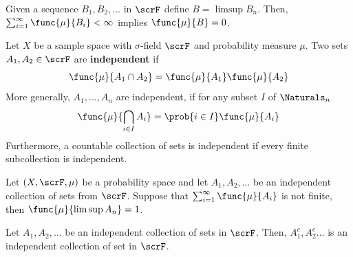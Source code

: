 \begin{theorem}
    Given a sequence \(B_1, B_2,\dots\) in \(\scrF\) define \(B = \limsup B_n\). Then, \(\sum_{i= 1}^{\infty} \func{\mu}{B_i} < \infty\) implies \(\func{\mu}{B} = 0\).
\end{theorem}

\begin{definition}
    Let \(X\) be a sample space with \(\sigma\)-field \(\scrF\) and probability measure \(\mu\). Two sets \(A_1,A_2 \in \scrF\) are \textbf{independent} if 
    \begin{equation*}
        \func{\mu}{A_1 \cap A_2} = \func{\mu}{A_1}\func{\mu}{A_2}
    \end{equation*}
    More generally, \(A_1, \dots, A_n\) are independent, if for any subset \(I\) of \(\Naturals_n\)
    \begin{equation*}
        \func{\mu}{\bigcap_{i \in I}A_i} = \prob{i \in I} \func{\mu}{A_i}
    \end{equation*}
    Furthermore, a countable collection of sets is independent if every finite subcollection is independent.
\end{definition}

\begin{theorem}
    Let \((X,\scrF,\mu)\) be a probability space and let \(A_1,A_2,\dots\) be an independent collection of sets from \(\scrF\). Suppose that \(\sum_{i = 1}^{\infty} \func{\mu}{A_i} \) is not finite, then \(\func{\mu}{\limsup A_n} =1\).
\end{theorem}

\begin{lemma}
    Let \(A_1, A_2 , \dots \) be an independent collection of sets in \(\scrF\). Then, \(A_1^c, A_2^c \dots\) is an independent collection of set in \(\scrF\).
\end{lemma}